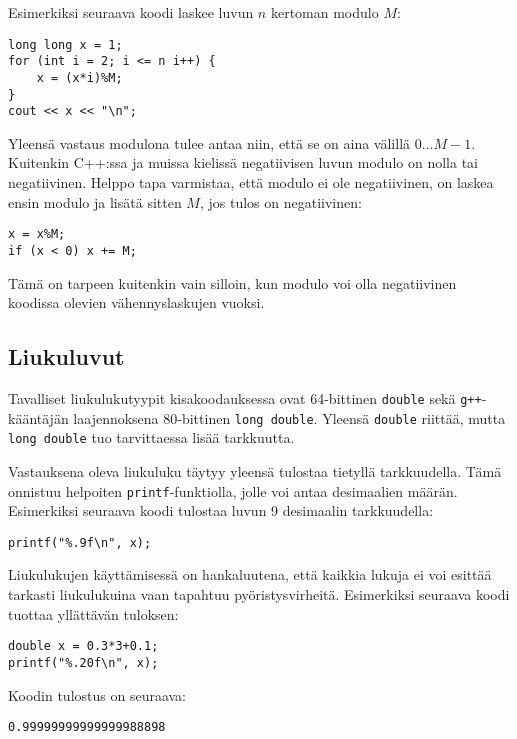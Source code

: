 Esimerkiksi seuraava koodi
laskee luvun $n$ kertoman modulo $M$:

\begin{lstlisting}
long long x = 1;
for (int i = 2; i <= n i++) {
    x = (x*i)%M;
}
cout << x << "\n";
\end{lstlisting}

Yleensä vastaus modulona tulee antaa niin,
että se on aina välillä $0\ldots M-1$.
Kuitenkin C++:ssa ja muissa
kielissä negatiivisen
luvun modulo on nolla tai negatiivinen.
Helppo tapa varmistaa, että modulo ei ole negatiivinen,
on laskea ensin modulo ja lisätä sitten $M$,
jos tulos on negatiivinen:

\begin{lstlisting}
x = x%M;
if (x < 0) x += M;
\end{lstlisting}
Tämä on tarpeen kuitenkin vain silloin,
kun modulo voi olla negatiivinen
koodissa olevien vähennyslaskujen vuoksi.

\subsection{Liukuluvut}

Tavalliset liukulukutyypit kisakoodauksessa
ovat 64-bittinen \texttt{double}
sekä \texttt{g++}-kääntäjän
laajennoksena
80-bittinen \texttt{long double}.
Yleensä \texttt{double} riittää,
mutta \texttt{long double} tuo tarvittaessa
lisää tarkkuutta.

Vastauksena oleva liukuluku täytyy yleensä tulostaa
tietyllä tarkkuudella.
Tämä onnistuu helpoiten \texttt{printf}-funktiolla,
jolle voi antaa desimaalien määrän.
Esimerkiksi seuraava koodi tulostaa luvun 9
desimaalin tarkkuudella:

\begin{lstlisting}
printf("%.9f\n", x);
\end{lstlisting}

Liukulukujen käyttämisessä on hankaluutena,
että kaikkia lukuja ei voi esittää tarkasti
liukulukuina vaan tapahtuu pyöristysvirheitä.
Esimerkiksi seuraava koodi tuottaa yllättävän tuloksen:

\begin{lstlisting}
double x = 0.3*3+0.1;
printf("%.20f\n", x);
\end{lstlisting}

Koodin tulostus on seuraava:

\begin{lstlisting}
0.99999999999999988898
\end{lstlisting}

